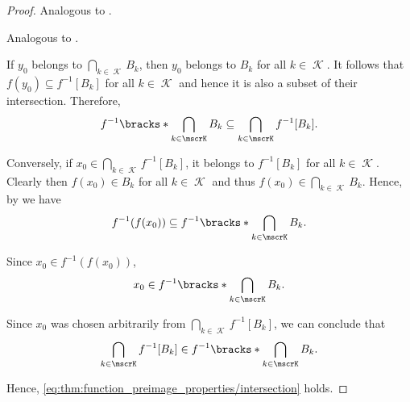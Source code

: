 \begin{proof}
   Analogous to .

   Analogous to .

   If \( y_0 \) belongs to \( \bigcap_{k \in \mscrK} B_k \), then \( y_0 \) belongs to \( B_k \) for all \( k \in \mscrK \). It follows that \( f(y_0) \subseteq f^{-1}[B_k] \) for all \( k \in \mscrK \) and hence it is also a subset of their intersection. Therefore,
  \begin{equation*}
    f^{-1} \bracks*{ \bigcap_{k \in \mscrK} B_k } \subseteq \bigcap_{k \in \mscrK} f^{-1}[B_k].
  \end{equation*}

  Conversely, if \( x_0 \in \bigcap_{k \in \mscrK} f^{-1}[B_k] \), it belongs to \( f^{-1}[B_k] \) for all \( k \in \mscrK \). Clearly then \( f(x_0) \in B_k \) for all \( k \in \mscrK \) and thus \( f(x_0) \in \bigcap_{k \in \mscrK} B_k \). Hence, by  we have
  \begin{equation*}
    f^{-1}(f(x_0))
    \subseteq
    f^{-1}\bracks*{ \bigcap_{k \in \mscrK} B_k }.
  \end{equation*}

  Since \( x_0 \in f^{-1}(f(x_0)) \),
  \begin{equation*}
    x_0 \in f^{-1}\bracks*{ \bigcap_{k \in \mscrK} B_k }.
  \end{equation*}

  Since \( x_0 \) was chosen arbitrarily from \( \bigcap_{k \in \mscrK} f^{-1}[B_k] \), we can conclude that
  \begin{equation*}
    \bigcap_{k \in \mscrK} f^{-1}[B_k] \in f^{-1}\bracks*{ \bigcap_{k \in \mscrK} B_k }.
  \end{equation*}

  Hence, \eqref{eq:thm:function_preimage_properties/intersection} holds.


\end{proof}
